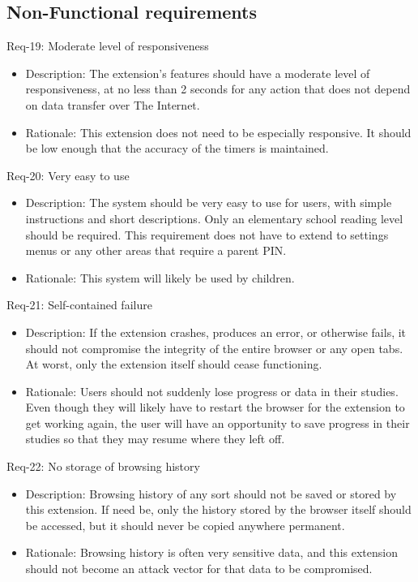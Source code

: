 \documentclass[12pt]{article}
\begin{document}
\subsection{Non-Functional requirements}
\noindent
Req-19: Moderate level of responsiveness
\begin{itemize}
    \item Description: The extension's features should have a moderate level of responsiveness, at no less than 2 seconds for any action that does not depend on data transfer over The Internet.
    \item Rationale: This extension does not need to be especially responsive. It should be low enough that the accuracy of the timers is maintained.
\end{itemize}
Req-20: Very easy to use
\begin{itemize}
    \item Description: The system should be very easy to use for users, with simple instructions and short descriptions. Only an elementary school reading level should be required. This requirement does not have to extend to settings menus or any other areas that require a parent PIN.
    \item Rationale: This system will likely be used by children.
\end{itemize}
Req-21: Self-contained failure
\begin{itemize}
    \item Description: If the extension crashes, produces an error, or otherwise fails, it should not compromise the integrity of the entire browser or any open tabs. At worst, only the extension itself should cease functioning.
    \item Rationale: Users should not suddenly lose progress or data in their studies. Even though they will likely have to restart the browser for the extension to get working again, the user will have an opportunity to save progress in their studies so that they may resume where they left off.
\end{itemize}
Req-22:  No storage of browsing history
\begin{itemize}
    \item Description: Browsing history of any sort should not be saved or stored by this extension. If need be, only the history stored by the browser itself should be accessed, but it should never be copied anywhere permanent.
    \item Rationale: Browsing history is often very sensitive data, and this extension should not become an attack vector for that data to be compromised.
\end{itemize}
\end{document}
